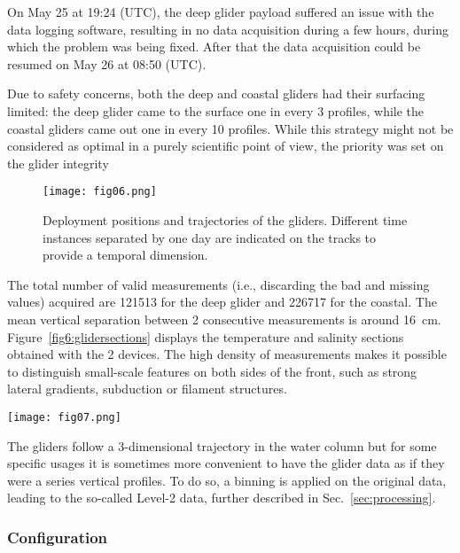 \documentclass[essd,manuscript]{copernicus}
\begin{document}
On May 25 at 19:24 (UTC), the deep glider payload suffered an issue with the data logging software, resulting in no data acquisition during a few hours, during which the problem was being fixed. After that the data acquisition could be resumed on May 26 at 08:50 (UTC).

Due to safety concerns, both the deep and coastal gliders had their surfacing limited: the deep glider came to the surface one in every 3 profiles, while the coastal gliders came out one in every 10 profiles. While this strategy might not be considered as optimal in a purely scientific point of view, the priority was set on the glider integrity

\begin{figure}[t]
\texttt{[image: fig06.png]}
\caption{Deployment positions and trajectories of the gliders. Different time instances separated by one day are indicated on the tracks to provide a temporal dimension.\label{fig6:glidertracks}}
\end{figure}

The total number of valid measurements (i.e., discarding the bad and missing values) acquired are 121513 for the deep glider and 226717 for the coastal. The mean vertical separation between 2 consecutive measurements is around 16~cm. Figure~\ref{fig6:glidersections} displays the temperature and salinity sections obtained with the 2 devices. The high density of measurements makes it possible to distinguish small-scale features on both sides of the front, such as strong lateral gradients, subduction or filament structures.  

\begin{figure*}[t]
\texttt{[image: fig07.png]}
\caption{Temperature (top) and salinity measured by the two gliders. The approximative front position at the surface is shown as a dashed, grey line.\label{fig6:glidersections}}
\end{figure*}

The gliders follow a 3-dimensional trajectory in the water column but for some specific usages it is sometimes more convenient to have the glider data as if they were a series vertical profiles. To do so, a binning is applied on the original data, leading to the so-called Level-2 data, further described in Sec.~\ref{sec:processing}.

\subsubsection{Configuration}
\end{document}

